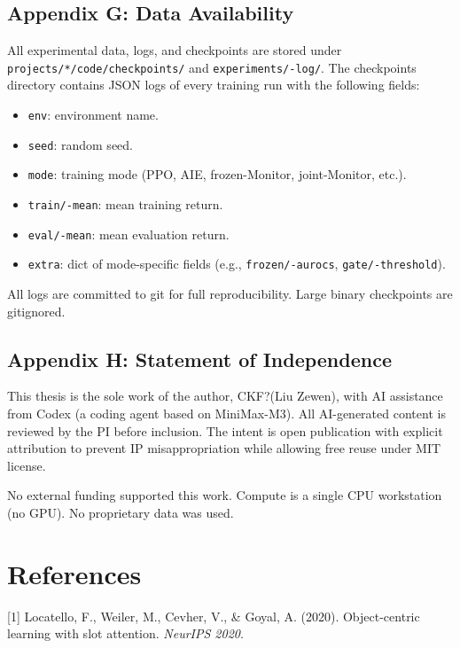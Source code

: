\documentclass[11pt]{article}
\begin{document}
\hrulefill

\subsection{Appendix G: Data Availability}

All experimental data, logs, and checkpoints are stored under
\texttt{projects/*/code/checkpoints/} and \texttt{experiments/-log/}. The checkpoints directory
contains JSON logs of every training run with the following fields:

\begin{itemize}
  \item \texttt{env}: environment name.
  \item \texttt{seed}: random seed.
  \item \texttt{mode}: training mode (PPO, AIE, frozen-Monitor, joint-Monitor, etc.).
  \item \texttt{train/-mean}: mean training return.
  \item \texttt{eval/-mean}: mean evaluation return.
  \item \texttt{extra}: dict of mode-specific fields (e.g., \texttt{frozen/-aurocs}, \texttt{gate/-threshold}).
\end{itemize}


All logs are committed to git for full reproducibility. Large binary checkpoints
are gitignored.

\hrulefill

\subsection{Appendix H: Statement of Independence}

This thesis is the sole work of the author, CKF?(Liu Zewen), with AI
assistance from Codex (a coding agent based on MiniMax-M3). All AI-generated
content is reviewed by the PI before inclusion. The intent is open publication
with explicit attribution to prevent IP misappropriation while allowing free
reuse under MIT license.

No external funding supported this work. Compute is a single CPU workstation
(no GPU). No proprietary data was used.

\hrulefill

\section*{References}

[1] Locatello, F., Weiler, M., Cevher, V., \& Goyal, A. (2020). Object-centric
    learning with slot attention. \textit{NeurIPS 2020}.
\end{document}
